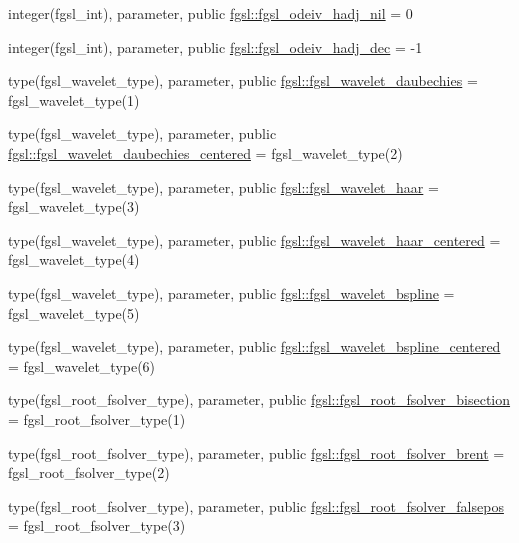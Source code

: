 \begin{DoxyCompactItemize}
\item 
integer(fgsl\+\_\+int), parameter, public \hyperlink{namespacefgsl_ac1c1bce27a4a8cb6ac049b401b496372}{fgsl\+::fgsl\+\_\+odeiv\+\_\+hadj\+\_\+nil} = 0
\item 
integer(fgsl\+\_\+int), parameter, public \hyperlink{namespacefgsl_a2325b2b4a96fc162d6be916e21d71bb0}{fgsl\+::fgsl\+\_\+odeiv\+\_\+hadj\+\_\+dec} = -\/1
\item 
type(fgsl\+\_\+wavelet\+\_\+type), parameter, public \hyperlink{namespacefgsl_a67c3173fcd7991624114d64eb31bf6d8}{fgsl\+::fgsl\+\_\+wavelet\+\_\+daubechies} = fgsl\+\_\+wavelet\+\_\+type(1)
\item 
type(fgsl\+\_\+wavelet\+\_\+type), parameter, public \hyperlink{namespacefgsl_a26df4eaadbaa474bae2dca6abdaea27f}{fgsl\+::fgsl\+\_\+wavelet\+\_\+daubechies\+\_\+centered} = fgsl\+\_\+wavelet\+\_\+type(2)
\item 
type(fgsl\+\_\+wavelet\+\_\+type), parameter, public \hyperlink{namespacefgsl_a416323050493f1845d764b5bf3599477}{fgsl\+::fgsl\+\_\+wavelet\+\_\+haar} = fgsl\+\_\+wavelet\+\_\+type(3)
\item 
type(fgsl\+\_\+wavelet\+\_\+type), parameter, public \hyperlink{namespacefgsl_a98a440f78f036ed2b35f84992ba0db82}{fgsl\+::fgsl\+\_\+wavelet\+\_\+haar\+\_\+centered} = fgsl\+\_\+wavelet\+\_\+type(4)
\item 
type(fgsl\+\_\+wavelet\+\_\+type), parameter, public \hyperlink{namespacefgsl_a6fb8d8501c5f52d65dd32be21f7a8431}{fgsl\+::fgsl\+\_\+wavelet\+\_\+bspline} = fgsl\+\_\+wavelet\+\_\+type(5)
\item 
type(fgsl\+\_\+wavelet\+\_\+type), parameter, public \hyperlink{namespacefgsl_a61c7f4e05d439d135784a3d84e7f9b3a}{fgsl\+::fgsl\+\_\+wavelet\+\_\+bspline\+\_\+centered} = fgsl\+\_\+wavelet\+\_\+type(6)
\item 
type(fgsl\+\_\+root\+\_\+fsolver\+\_\+type), parameter, public \hyperlink{namespacefgsl_aa7dc27fd2c5eda5bdd57f4936c041faf}{fgsl\+::fgsl\+\_\+root\+\_\+fsolver\+\_\+bisection} = fgsl\+\_\+root\+\_\+fsolver\+\_\+type(1)
\item 
type(fgsl\+\_\+root\+\_\+fsolver\+\_\+type), parameter, public \hyperlink{namespacefgsl_a097401e95907837ed18233ae594898d2}{fgsl\+::fgsl\+\_\+root\+\_\+fsolver\+\_\+brent} = fgsl\+\_\+root\+\_\+fsolver\+\_\+type(2)
\item 
type(fgsl\+\_\+root\+\_\+fsolver\+\_\+type), parameter, public \hyperlink{namespacefgsl_ac71356c84267ed5e1dba5501be28b428}{fgsl\+::fgsl\+\_\+root\+\_\+fsolver\+\_\+falsepos} = fgsl\+\_\+root\+\_\+fsolver\+\_\+type(3)

\end{DoxyCompactItemize}
